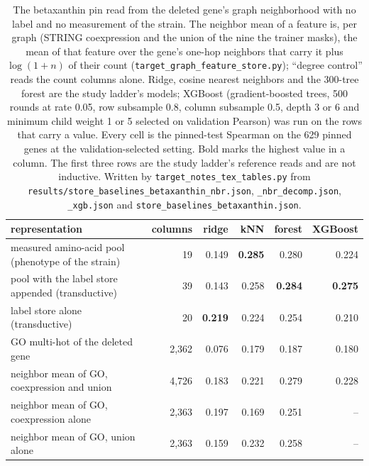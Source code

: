 \begin{table}[H]
  \centering
  \footnotesize
  \caption[Inductive reads of the neighborhood on the CPU ladder]{The betaxanthin pin read from the deleted gene's graph neighborhood with no label and no measurement of the strain. The neighbor mean of a feature is, per graph (STRING coexpression and the union of the nine the trainer masks), the mean of that feature over the gene's one-hop neighbors that carry it plus $\log(1 + n)$ of their count (\texttt{target\_graph\_feature\_store.py}); ``degree control'' reads the count columns alone. Ridge, cosine nearest neighbors and the 300-tree forest are the study ladder's models; XGBoost (gradient-boosted trees, 500 rounds at rate 0.05, row subsample 0.8, column subsample 0.5, depth 3 or 6 and minimum child weight 1 or 5 selected on validation Pearson) was run on the rows that carry a value. Every cell is the pinned-test Spearman on the 629 pinned genes at the validation-selected setting. Bold marks the highest value in a column. The first three rows are the study ladder's reference reads and are not inductive. Written by \texttt{target\_notes\_tex\_tables.py} from \texttt{results/store\_baselines\_betaxanthin\_nbr.json}, \texttt{\_nbr\_decomp.json}, \texttt{\_xgb.json} and \texttt{store\_baselines\_betaxanthin.json}.}
  \label{tab:neighborhood-reads}
  \begin{tabular}{@{}lrrrrr@{}}
    \hline
    representation & columns & ridge & kNN & forest & XGBoost \\
    \hline
    measured amino-acid pool (phenotype of the strain) & 19 & 0.149 & \textbf{0.285} & 0.280 & 0.224 \\
    pool with the label store appended (transductive) & 39 & 0.143 & 0.258 & \textbf{0.284} & \textbf{0.275} \\
    label store alone (transductive) & 20 & \textbf{0.219} & 0.224 & 0.254 & 0.210 \\
    GO multi-hot of the deleted gene & 2,362 & 0.076 & 0.179 & 0.187 & 0.180 \\
    neighbor mean of GO, coexpression and union & 4,726 & 0.183 & 0.221 & 0.279 & 0.228 \\
    neighbor mean of GO, coexpression alone & 2,363 & 0.197 & 0.169 & 0.251 & -- \\
    neighbor mean of GO, union alone & 2,363 & 0.159 & 0.232 & 0.258 & -- \\

\end{tabular}
\end{table}
